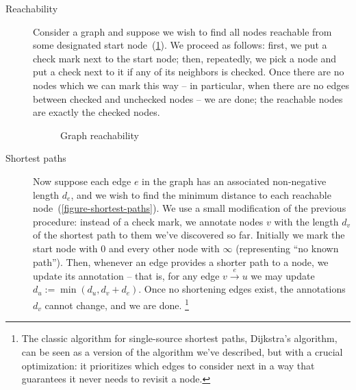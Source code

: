 \begin{description}
\item[Reachability] %
%
Consider a graph and suppose we wish to find all nodes reachable from some
designated start node~(\cref{figure-reachability}). We proceed as follows:
first, we put a check mark next to the start node; then, repeatedly, we pick a
node and put a check next to it if any of its neighbors is checked. Once there
are no nodes which we can mark this way -- in particular, when there are no
edges between checked and unchecked nodes -- we are done; the reachable nodes
are exactly the checked nodes.



\begin{figure}[pth]
  \centering
  \XXX
  \caption{Graph reachability}
  \label{figure-reachability}
\end{figure}


\item[Shortest paths]
%
Now suppose each edge $e$ in the graph has an associated non-negative length
$d_e$, and we wish to find the minimum distance to each reachable
node~(\cref{figure-shortest-paths}). We use a small modification of the previous
procedure: instead of a check mark, we annotate nodes $v$ with the length $d_v$
of the shortest path to them we've discovered so far. Initially we mark the
start node with 0 and every other node with $\infty$ (representing ``no known
path'').
%
%
%
Then, whenever an edge provides a shorter path to a node, we update its
annotation -- that is, for any edge $v \xrightarrow{e} u$ we may update $d_u :=
\min(d_u, d_v + d_e)$.
%
Once no shortening edges exist, the annotations $d_v$ cannot change, and we are done.%
%
%
\footnote{The classic algorithm for single-source shortest paths, Dijkstra's
  algorithm, can be seen as a version of the algorithm we've described, but with
  a crucial optimization: it prioritizes which edges to consider next in a
  way that guarantees it never needs to revisit a node.}


\end{description}
